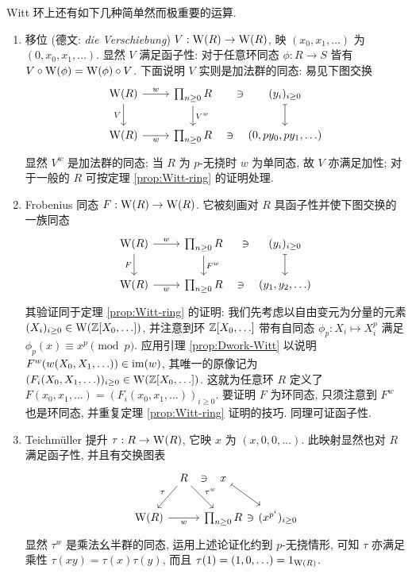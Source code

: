Witt 环上还有如下几种简单然而极重要的运算.
\begin{enumerate}
	\item 移位 (德文: \textit{die Verschiebung}) $V: \operatorname{W}(R) \to \operatorname{W}(R)$, 映 $(x_0, x_1, \ldots)$ 为 $(0, x_0, x_1, \ldots)$. 显然 $V$ 满足函子性: 对于任意环同态 $\phi: R \to S$ 皆有 $V \circ \operatorname{W}(\phi) = \operatorname{W}(\phi) \circ V$. 下面说明 $V$ 实则是加法群的同态: 易见下图交换
		\[\begin{tikzcd}
			\WittV(R) \arrow[r, "w"] \arrow[d, "V"'] & \prod_{n \geq 0} R \arrow[d, "{V^w}"] & (y_i)_{i \geq 0} \arrow[phantom, l, "\ni" description] \arrow[mapsto, d] \\
			\WittV(R) \arrow[r, "w"'] & \prod_{n \geq 0} R & (0, py_0, py_1, \ldots) \arrow[phantom, l, "\ni" description]
		\end{tikzcd}\]
		显然 $V^w$ 是加法群的同态; 当 $R$ 为 $p$-无挠时 $w$ 为单同态, 故 $V$ 亦满足加性; 对于一般的 $R$ 可按定理 \ref{prop:Witt-ring} 的证明处理.
	\item Frobenius 同态 $F: \operatorname{W}(R) \to \operatorname{W}(R)$. 它被刻画对 $R$ 具函子性并使下图交换的一族同态
		\[\begin{tikzcd}
			\WittV(R) \arrow[r, "w"] \arrow[d, "F"'] & \prod_{n \geq 0} R \arrow[d, "{F^w}"] & (y_i)_{i \geq 0} \arrow[phantom, l, "\ni" description] \arrow[mapsto, d] \\
			\WittV(R) \arrow[r, "w"'] & \prod_{n \geq 0} R & (y_1, y_2, \ldots) \arrow[phantom, l, "\ni" description]
		\end{tikzcd} \]
		其验证同于定理 \ref{prop:Witt-ring} 的证明: 我们先考虑以自由变元为分量的元素 $(X_i)_{i \geq 0} \in \operatorname{W}(\mathbb{Z}[X_0, \ldots])$, 并注意到环 $\mathbb{Z}[X_0, \ldots]$ 带有自同态 $\phi_p: X_i \mapsto X_i^p$ 满足 $\phi_p(x) \equiv x^p \pmod p$. 应用引理 \ref{prop:Dwork-Witt} 以说明 $F^w(w(X_0, X_1, \ldots)) \in \operatorname{im}(w)$, 其唯一的原像记为 $(F_i(X_0, X_1, \ldots))_{i \geq 0} \in \operatorname{W}(\mathbb{Z}[X_0, \ldots])$. 这就为任意环 $R$ 定义了 $F(x_0, x_1, \ldots) = (F_i(x_0, x_1, \ldots))_{i \geq 0}$. 要证明 $F$ 为环同态, 只须注意到 $F^w$ 也是环同态, 并重复定理 \ref{prop:Witt-ring} 证明的技巧. 同理可证函子性.
	\item Teichmüller 提升 $\tau: R \to \operatorname{W}(R)$, 它映 $x$ 为 $(x,0,0, \ldots)$. 此映射显然也对 $R$ 满足函子性, 并且有交换图表
		\[\begin{tikzcd}[column sep=tiny]
			& R \arrow[ld, "\tau"'] \arrow[rd, "\tau^w"] & x \arrow[phantom, l, "\ni" description] \arrow[mapsto, rd] & \\
			\WittV(R) \arrow[rr, "w"'] & & \prod_{n \geq 0} R & (x^{p^i})_{i \geq 0} \arrow[phantom, l, "\ni" description]
		\end{tikzcd}\]
		显然 $\tau^w$ 是乘法幺半群的同态, 运用上述论证化约到 $p$-无挠情形, 可知 $\tau$ 亦满足乘性 $\tau(xy)=\tau(x)\tau(y)$, 而且 $\tau(1) = (1,0, \ldots) = 1_{\operatorname{W}(R)}$.
\end{enumerate}

